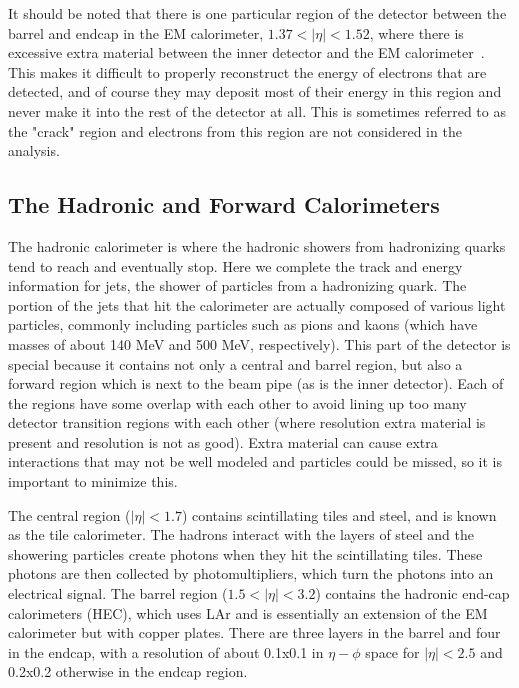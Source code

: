 It should be noted that there is one particular region of the detector between the barrel and endcap in the EM calorimeter, $1.37 < | \eta | < 1.52$, where there is excessive extra material between the inner detector and the EM calorimeter~\cite{Electron}.  This makes it difficult to properly reconstruct the energy of electrons that are detected, and of course they may deposit most of their energy in this region and never make it into the rest of the detector at all.  This is sometimes referred to as the "crack" region and electrons from this region are not considered in the analysis.

\subsection{The Hadronic and Forward Calorimeters}
The hadronic calorimeter is where the hadronic showers from hadronizing quarks tend to reach and eventually stop.  Here we complete the track and energy information for jets, the shower of particles from a hadronizing quark.  The portion of the jets that hit the calorimeter are actually composed of various light particles, commonly including particles such as pions and kaons (which have masses of about 140 MeV and 500 MeV, respectively). This part of the detector is special because it contains not only a central and barrel region, but also a forward region which is next to the beam pipe (as is the inner detector).  Each of the regions have some overlap with each other to avoid lining up too many detector transition regions with each other (where resolution extra material is present and resolution is not as good).  Extra material can cause extra interactions that may not be well modeled and particles could be missed, so it is important to minimize this.

The central region ($|\eta| < 1.7$) contains scintillating tiles and steel, and is known as the tile calorimeter.  The hadrons interact with the layers of steel and the showering particles create photons when they hit the scintillating tiles.  These photons are then collected by photomultipliers, which turn the photons into an electrical signal.  The barrel region ($1.5 < |\eta| < 3.2$) contains the hadronic end-cap calorimeters (HEC), which uses LAr and is essentially an extension of the EM calorimeter but with copper plates.  There are three layers in the barrel and four in the endcap, with a resolution of about 0.1x0.1 in $\eta - \phi$ space for $| \eta | < 2.5$ and 0.2x0.2 otherwise in the endcap region.

